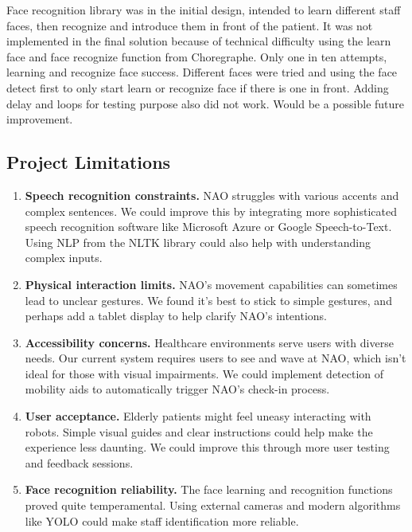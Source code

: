 \documentclass[conference]{IEEEtran}
\begin{document}
Face recognition library was in the initial design, intended to learn different staff faces, then recognize and introduce them in front of the patient. It was not implemented in the final solution because of technical difficulty using the learn face and face recognize function from Choregraphe. Only one in ten attempts, learning and recognize face success. Different faces were tried and using the face detect first to only start learn or recognize face if there is one in front. Adding delay and loops for testing purpose also did not work. Would be a possible future improvement.


\subsection{Project Limitations}

\begin{enumerate} 
        \item \textbf{Speech recognition constraints.} NAO struggles with various accents and complex sentences. We could improve this by integrating more sophisticated speech recognition software like Microsoft Azure or Google Speech-to-Text. Using NLP from the NLTK library could also help with understanding complex inputs.
        
        \item \textbf{Physical interaction limits.} NAO's movement capabilities can sometimes lead to unclear gestures. We found it's best to stick to simple gestures, and perhaps add a tablet display to help clarify NAO's intentions.
        
        \item \textbf{Accessibility concerns.} Healthcare environments serve users with diverse needs. Our current system requires users to see and wave at NAO, which isn't ideal for those with visual impairments. We could implement detection of mobility aids to automatically trigger NAO's check-in process.
        
        \item \textbf{User acceptance.} Elderly patients might feel uneasy interacting with robots. Simple visual guides and clear instructions could help make the experience less daunting. We could improve this through more user testing and feedback sessions.
        
        \item \textbf{Face recognition reliability.} The face learning and recognition functions proved quite temperamental. Using external cameras and modern algorithms like YOLO could make staff identification more reliable.
\end{enumerate}
\end{document}
